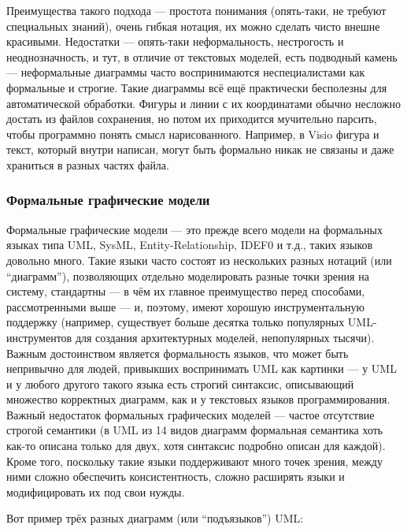 \documentclass[a5paper]{article}
\begin{document}
Преимущества такого подхода --- простота понимания (опять-таки, не требуют специальных знаний), очень гибкая нотация, их можно сделать чисто внешне красивыми. Недостатки --- опять-таки неформальность, нестрогость и неоднозначность, и тут, в отличие от текстовых моделей, есть подводный камень --- неформальные диаграммы часто воспринимаются неспециалистами как формальные и строгие. Такие диаграммы всё ещё практически бесполезны для автоматической обработки. Фигуры и линии с их координатами обычно несложно достать из файлов сохранения, но потом их приходится мучительно парсить, чтобы программно понять смысл нарисованного. Например, в Visio фигура и текст, который внутри написан, могут быть формально никак не связаны и даже храниться в разных частях файла.

\subsubsection{Формальные графические модели}

Формальные графические модели --- это прежде всего модели на формальных языках типа UML, SysML, Entity-Relationship, IDEF0 и т.д., таких языков довольно много. Такие языки часто состоят из нескольких разных нотаций (или ``диаграмм''), позволяющих отдельно моделировать разные точки зрения на систему, стандартны --- в чём их главное преимущество перед способами, рассмотренными выше --- и, поэтому, имеют хорошую инструментальную поддержку (например, существует больше десятка только популярных UML-инструментов для создания архитектурных моделей, непопулярных тысячи). Важным достоинством является формальность языков, что может быть непривычно для людей, привыкших воспринимать UML как картинки --- у UML и у любого другого такого языка есть строгий синтаксис, описывающий множество корректных диаграмм, как и у текстовых языков программирования. Важный недостаток формальных графических моделей --- частое отсутствие строгой семантики (в UML из 14 видов диаграмм формальная семантика хоть как-то описана только для двух, хотя синтаксис подробно описан для каждой). Кроме того, поскольку такие языки поддерживают много точек зрения, между ними сложно обеспечить консистентность, сложно расширять языки и модифицировать их под свои нужды.

Вот пример трёх разных диаграмм (или ``подъязыков'') UML:
\end{document}
